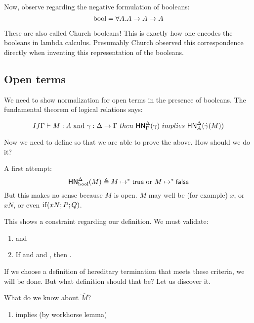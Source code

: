 \documentclass{article}
\begin{document}
Now, observe regarding the negative formulation of booleans:
\[
\text{bool} = \forall A . A \to A \to A
\]

These are also called Church booleans! This is exactly how one encodes the booleans in lambda calculus. Presumably Church observed this correspondence directly when inventing this representation of the booleans.

\subsection{Open terms}
We need to show normalization for open terms in the presence of booleans. The fundamental theorem of logical relations says:

\[
If \hasEF{\Gamma}{M}{A} \ \text{and} \ \gamma : \Delta \to \Gamma \ then \  \hnorm{\Delta}{\Gamma}{\gamma} \ implies \ \hnorm{\Delta}{A}{\hat\gamma(M)}
\]

Now we need to define  so that we are able to prove the above. How should we do it?

A first attempt:
\[
\mathsf{HN}^{\Delta}_{\text{bool}}(M) \triangleq M \mapsto^* \mathsf{true} \ \text{or} \ M \mapsto^* \mathsf{false}
\]
But this makes no sense because $M$ is open. $M$ may well be (for example) $x$, or $x N$, or even $\mathrm{if}(x N; P; Q)$.

This shows a constraint regarding our definition. We must validate:
\begin{lemma}
\leavevmode
\label{ht-prods}
\begin{enumerate}
\item \hnorm{\Delta}{\booltype}{\true} and \hnorm{\Delta}{\booltype}{\false}
\item If  and  and , then .
\end{enumerate}
\end{lemma}

If we choose a definition of hereditary termination that meets these criteria, we will be done. But what definition should that be? Let us discover it.

What do we know about $\hat M$?

\begin{enumerate}
\item {} implies  (by workhorse lemma)
\end{enumerate}
\end{document}
